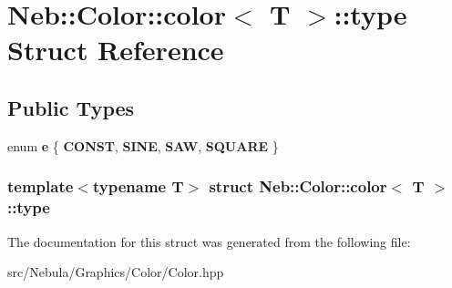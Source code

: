 \hypertarget{structNeb_1_1Color_1_1color_1_1type}{\section{\-Neb\-:\-:\-Color\-:\-:color$<$ \-T $>$\-:\-:type \-Struct \-Reference}
\label{structNeb_1_1Color_1_1color_1_1type}
}
\subsection*{\-Public \-Types}
\begin{DoxyCompactItemize}
\item 
enum {\bfseries e} \{ {\bfseries \-C\-O\-N\-S\-T}, 
{\bfseries \-S\-I\-N\-E}, 
{\bfseries \-S\-A\-W}, 
{\bfseries \-S\-Q\-U\-A\-R\-E}
 \}
\end{DoxyCompactItemize}
\subsubsection*{template$<$typename \-T$>$ struct Neb\-::\-Color\-::color$<$ T $>$\-::type}



\-The documentation for this struct was generated from the following file\-:\begin{DoxyCompactItemize}
\item 
src/\-Nebula/\-Graphics/\-Color/\-Color.\-hpp\end{DoxyCompactItemize}
